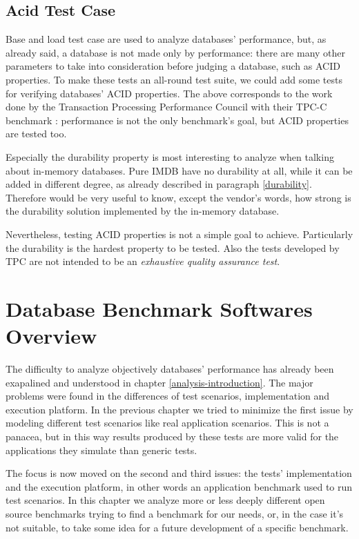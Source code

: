 	\section{Acid Test Case}
Base and load test case are used to analyze databases' performance, but, as already said, a database is not made only by performance: there are many other parameters to take into consideration before judging a database, such as ACID properties. To make these tests an all-round test suite, we could add some tests for verifying databases' ACID properties. The above corresponds to the work done by the Transaction Processing Performance Council with their TPC-C benchmark \cite{TPC-C}: performance is not the only benchmark's goal, but ACID properties are tested too.

Especially the durability property is most interesting to analyze when talking about in-memory databases. Pure IMDB have no durability at all, while it can be added in different degree, as already described in paragraph \ref{durability}. Therefore would be very useful to know, except the vendor's words, how strong is the durability solution implemented by the in-memory database.

Nevertheless, testing ACID properties is not a simple goal to achieve. Particularly the durability is the hardest property to be tested. Also the tests developed by TPC are not intended to be an \emph{exhaustive quality assurance test}.

\chapter{Database Benchmark Softwares Overview}
The difficulty to analyze objectively databases' performance has already been exapalined and understood in chapter \ref{analysis-introduction}. The major problems were found in the differences of test scenarios, implementation and execution platform. In the previous chapter we tried to minimize the first issue by modeling different test scenarios like real application scenarios. This is not a panacea, but in this way results produced by these tests are more valid for the applications they simulate than generic tests. 

The focus is now moved on the second and third issues: the tests' implementation and the execution platform, in other words an application benchmark used to run test scenarios. In this chapter we analyze more or less deeply different open source benchmarks trying to find a benchmark for our needs, or, in the case it's not suitable, to take some idea for a future development of a specific benchmark.

